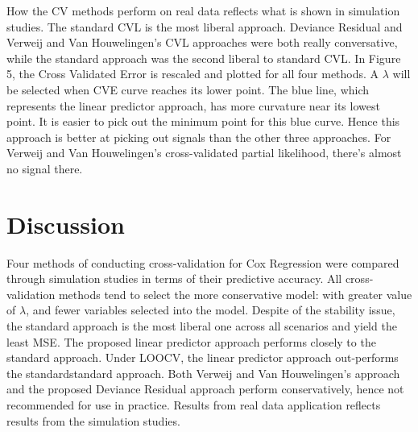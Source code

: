 \par How the CV methods perform on real data reflects what is shown in simulation studies. The standard CVL is the most liberal approach. Deviance Residual and Verweij and Van Houwelingen's CVL approaches were both really conversative, while the standard approach was the second liberal to standard CVL. In Figure 5, the Cross Validated Error is rescaled and plotted for all four methods. A $\lambda$ will be selected when CVE curve reaches its lower point. The blue line, which represents the linear predictor approach, has more curvature near its lowest point. It is easier to pick out the minimum point for this blue curve. Hence this approach is better at picking out signals than the other three approaches. For Verweij and Van Houwelingen's cross-validated partial likelihood, there's almost no signal there.

\section{Discussion}
Four methods of conducting cross-validation for Cox Regression were compared through simulation studies in terms of their predictive accuracy. All cross-validation methods tend to select the more conservative model: with greater value of $\lambda$, and fewer variables selected into the model. Despite of the stability issue, the standard approach is the most liberal one across all scenarios and yield the least MSE. The proposed linear predictor approach performs closely to the standard approach. Under LOOCV, the linear predictor approach out-performs the standardstandard approach. Both Verweij and Van Houwelingen's approach and the proposed Deviance Residual approach perform conservatively, hence not recommended for use in practice. Results from real data application reflects results from the simulation studies.

